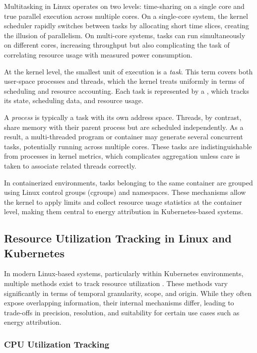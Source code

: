 Multitasking in Linux operates on two levels: time-sharing on a single core and true parallel execution across multiple cores. On a single-core system, the kernel scheduler rapidly switches between tasks by allocating short time slices, creating the illusion of parallelism. On multi-core systems, tasks can run simultaneously on different cores, increasing throughput but also complicating the task of correlating resource usage with measured power consumption.

At the kernel level, the smallest unit of execution is a \emph{task}. This term covers both user-space processes and threads, which the kernel treats uniformly in terms of scheduling and resource accounting. Each task is represented by a , which tracks its state, scheduling data, and resource usage.

A \emph{process} is typically a task with its own address space. Threads, by contrast, share memory with their parent process but are scheduled independently. As a result, a multi-threaded program or container may generate several concurrent tasks, potentially running across multiple cores. These tasks are indistinguishable from processes in kernel metrics, which complicates aggregation unless care is taken to associate related threads correctly.

In containerized environments, tasks belonging to the same container are grouped using Linux control groups (cgroups) and namespaces. These mechanisms allow the kernel to apply limits and collect resource usage statistics at the container level, making them central to energy attribution in Kubernetes-based systems.

\subsection{Resource Utilization Tracking in Linux and Kubernetes}
\label{sec:utilization_tracking}

In modern Linux-based systems, particularly within Kubernetes environments, multiple methods exist to track resource utilization \parencite{kernelprocfs, kernelcgroupv1, kernelcgroupv2, ciliumbpf, cadvisorgithub, metricsservergithub}. These methods vary significantly in terms of temporal granularity, scope, and origin. While they often expose overlapping information, their internal mechanisms differ, leading to trade-offs in precision, resolution, and suitability for certain use cases such as energy attribution.

\subsubsection{CPU Utilization Tracking}

